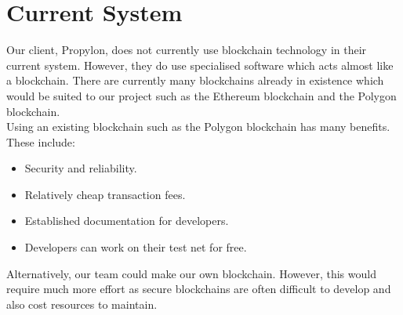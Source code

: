 \section{Current System}
Our client, Propylon, does not currently use blockchain technology in their current system.
However, they do use specialised software which acts almost like a blockchain. 
There are currently many blockchains already in existence which would be suited to our project 
such as the Ethereum blockchain and the Polygon blockchain. \\

\noindent
Using an existing blockchain such as the Polygon blockchain has many benefits. These include: 

\begin{itemize}
    \item Security and reliability.
    \item Relatively cheap transaction fees.
    \item Established documentation for developers.
    \item Developers can work on their test net for free.
\end{itemize}

\noindent
Alternatively, our team could make our own blockchain. 
However, this would require much more effort as secure blockchains 
are often difficult to develop and also cost resources to maintain. 

